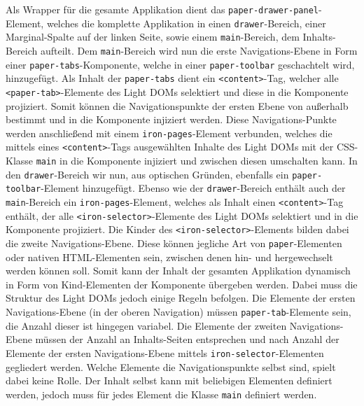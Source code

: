 Als Wrapper für die gesamte Applikation dient das \texttt{paper-drawer-panel}-Element, welches die komplette Applikation in einen \texttt{drawer}-Bereich, einer Marginal-Spalte auf der linken Seite, sowie einem \texttt{main}-Bereich, dem Inhalts-Bereich aufteilt. Dem \texttt{main}-Bereich wird nun die erste Navigations-Ebene in Form einer \texttt{paper-tabs}-Komponente, welche in einer \texttt{paper-toolbar} geschachtelt wird, hinzugefügt. Als Inhalt der \texttt{paper-tabs} dient ein \texttt{\textless{}content\textgreater{}}-Tag, welcher alle \texttt{\textless{}paper-tab\textgreater{}}-Elemente des Light \ac{DOM}s selektiert und diese in die Komponente projiziert. Somit können die Navigationspunkte der ersten Ebene von außerhalb bestimmt und in die Komponente injiziert werden. Diese Navigations-Punkte werden anschließend mit einem \texttt{iron-pages}-Element verbunden, welches die mittels eines \texttt{\textless{}content\textgreater{}}-Tags ausgewählten Inhalte des Light \ac{DOM}s mit der \ac{CSS}-Klasse \texttt{main} in die Komponente injiziert und zwischen diesen umschalten kann. In den \texttt{drawer}-Bereich wir nun, aus optischen Gründen, ebenfalls ein \texttt{paper-toolbar}-Element hinzugefügt. Ebenso wie der \texttt{drawer}-Bereich enthält auch der \texttt{main}-Bereich ein \texttt{iron-pages}-Element, welches als Inhalt einen \texttt{\textless{}content\textgreater{}}-Tag enthält, der alle \texttt{\textless{}iron-selector\textgreater{}}-Elemente des Light \ac{DOM}s selektiert und in die Komponente projiziert. Die Kinder des \texttt{\textless{}iron-selector\textgreater{}}-Elements bilden dabei die zweite Navigations-Ebene. Diese können jegliche Art von \texttt{paper}-Elementen oder nativen \ac{HTML}-Elementen sein, zwischen denen hin- und hergewechselt werden können soll. Somit kann der Inhalt der gesamten Applikation dynamisch in Form von Kind-Elementen der Komponente übergeben werden. Dabei muss die Struktur des Light \ac{DOM}s jedoch einige Regeln befolgen. Die Elemente der ersten Navigations-Ebene (in der oberen Navigation) müssen \texttt{paper-tab}-Elemente sein, die Anzahl dieser ist hingegen variabel. Die Elemente der zweiten Navigations-Ebene müssen der Anzahl an Inhalts-Seiten entsprechen und nach Anzahl der Elemente der ersten Navigations-Ebene mittels \texttt{iron-selector}-Elementen gegliedert werden. Welche Elemente die Navigationspunkte selbst sind, spielt dabei keine Rolle. Der Inhalt selbst kann mit beliebigen Elementen definiert werden, jedoch muss für jedes Element die Klasse \texttt{main} definiert werden.

